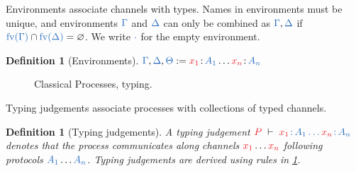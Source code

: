 \documentclass[submission,copyright,creativecommons]{eptcs}
\newtheorem{definition}[lemma]{Definition}
\begin{document}
Environments associate channels with types. Names in environments must be unique, and environments $\ty{\Gamma}$ and $\ty{\Delta}$ can only be combined as $\ty{\Gamma}, \ty{\Delta}$ if $\ty{\fv{\Gamma}} \cap \ty{\fv{\Delta}} = \varnothing$. We write $\ty{\cdot}$ for the empty environment.
\begin{definition}[Environments]\label{def:cp-environments}
  \(
    \ty{\Gamma}, \ty{\Delta}, \ty{\Theta} := \tmty{x_1}{A_1}\dots\tmty{x_n}{A_n}
  \)
\end{definition}\noindent
\begin{figure}[htb]
  \begin{center}\cpInfAx    \cpInfCut   \end{center}
  \begin{center}\cpInfTens  \cpInfParr  \end{center}
  \begin{center}\cpInfBot   \cpInfOne   \end{center}
  \begin{center}  \end{center}
  \begin{center}\cpInfWith              \end{center}
  \begin{center}\cpInfNil   \cpInfTop   \end{center}
  \caption{Classical Processes, typing.}
  \label{fig:cp}
\end{figure}\noindent
Typing judgements associate processes with collections of typed channels.
\begin{definition}[Typing judgements]\label{def:cp}
  A typing judgement $\seq[{ P }]{\tmty{x_1}{A_1}\dots\tmty{x_n}{A_n}}$ denotes
  that the process  communicates along channels $\tm{x_1}\dots\tm{x_n}$
  following protocols $\ty{A_1}\dots\ty{A_n}$.
  Typing judgements are derived using rules in \cref{fig:cp}.
\end{definition}\noindent
\end{document}
